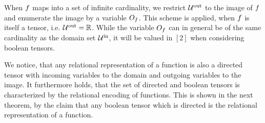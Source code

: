 \begin{remark}
	When $f$ maps into a set of infinite cardinality, we restrict $\mathcal{U}^{\mathrm{out}}$ to the image of $f$ and enumerate the image by a variable $O_{f}$.
	This scheme is applied, when $f$ is itself a tensor, i.e. $\mathcal{U}^{\mathrm{out}}=\mathbb{R}$.
	While the variable $O_{f}$ can in general be of the same cardinality as the domain set $\mathcal{U}^{\mathrm{in}}$, it will be valued in $[2]$ when considering boolean tensors.
\end{remark}

We notice, that any relational representation of a function is also a directed tensor with incoming variables to the domain and outgoing variables to the image.
It furthermore holds, that the set of directed and boolean tensors is characterized by the relational encoding of functions.
This is shown in the next theorem, by the claim that any boolean tensor which is directed is the relational representation of a function.

